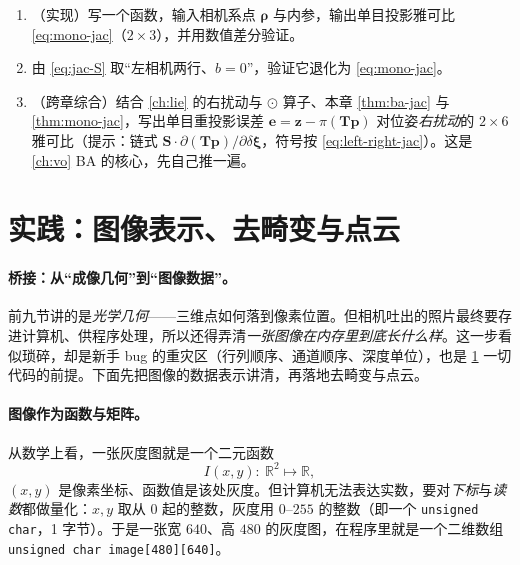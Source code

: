 \begin{practice}
\begin{enumerate}
  \item （实现）写一个函数，输入相机系点 $\boldsymbol\rho$ 与内参，输出单目投影雅可比 \cref{eq:mono-jac}（$2\times3$），并用数值差分验证。
  \item 由 \cref{eq:jac-S} 取“左相机两行、$b=0$”，验证它退化为 \cref{eq:mono-jac}。
  \item （跨章综合）结合 \cref{ch:lie} 的右扰动与 $\odot$ 算子、本章 \cref{thm:ba-jac} 与 \cref{thm:mono-jac}，写出单目重投影误差 $\mathbf{e}=\mathbf{z}-\pi(\mathbf{T}\mathbf{p})$ 对位姿\emph{右扰动}的 $2\times6$ 雅可比（提示：链式 $\mathbf{S}\cdot\partial(\mathbf{T}\mathbf{p})/\partial\delta\boldsymbol\xi$，符号按 \cref{eq:left-right-jac}）。这是 \cref{ch:vo} BA 的核心，先自己推一遍。
\end{enumerate}
\end{practice}

\section{实践：图像表示、去畸变与点云}
\label{sec:cam-practice}

\paragraph{桥接：从“成像几何”到“图像数据”。}
前九节讲的是\emph{光学几何}——三维点如何落到像素位置。但相机吐出的照片最终要存进计算机、供程序处理，所以还得弄清\emph{一张图像在内存里到底长什么样}\cite{gaoxiang2019slam14}。这一步看似琐碎，却是新手 bug 的重灾区（行列顺序、通道顺序、深度单位），也是 \cref{sec:cam-practice} 一切代码的前提。下面先把图像的数据表示讲清，再落地去畸变与点云。

\paragraph{图像作为函数与矩阵。}
从数学上看，一张灰度图就是一个二元函数\cite{gaoxiang2019slam14}
\begin{equation}
  I(x,y):\ \mathbb{R}^2\mapsto\mathbb{R},
  \label{eq:image-function}
\end{equation}
$(x,y)$ 是像素坐标、函数值是该处灰度。但计算机无法表达实数，要对\emph{下标}与\emph{读数}都做量化：$x,y$ 取从 $0$ 起的整数，灰度用 $0\text{–}255$ 的整数（即一个 \texttt{unsigned char}，1 字节）。于是一张宽 $640$、高 $480$ 的灰度图，在程序里就是一个二维数组 \texttt{unsigned char image[480][640]}。

